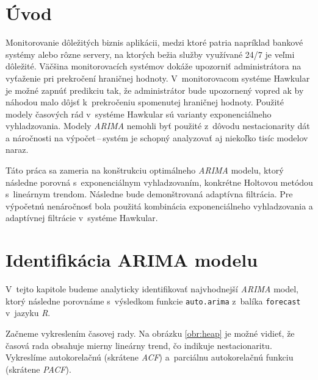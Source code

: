 \documentclass[12pt,a4paper,oneside,final]{article}
\theoremstyle{definition}
\theoremstyle{remark}
\numberwithin{equation}{section}
\begin{document}
\VytvorTitulniStranu

\section{Úvod}
Monitorovanie dôležitých biznis aplikácii, medzi ktoré patria napríklad bankové systémy alebo rôzne
servery, na ktorých bežia služby využívané 24/7 je veľmi dôležité. Väčšina
monitorovacích systémov dokáže upozorniť administrátora na vyťaženie pri prekročení
hraničnej hodnoty. V~monitorovacom systéme Hawkular je možné zapnúť predikciu tak, že
administrátor bude upozornený vopred ak by náhodou malo dôjsť k~prekročeniu spomenutej
hraničnej hodnoty. Použité modely časových rád v~systéme Hawkular sú varianty
exponenciálneho vyhladzovania. Modely \emph{ARIMA} nemohli byť použité z~dôvodu nestacionarity dát 
a náročnosti na výpočet\,--\,systém je schopný analyzovať aj niekoľko tisíc modelov naraz. 

Táto práca sa zameria na konštrukciu optimálneho \emph{ARIMA} modelu, ktorý následne porovná
s~exponenciálnym vyhladzovaním, konkrétne Holtovou metódou s~lineárnym trendom. Následne
bude demonštrovaná adaptívna filtrácia. Pre výpočetnú nenáročnosť  bola použitá 
kombinácia exponenciálneho vyhladzovania a
adaptívnej filtrácie v~systéme Hawkular.


\section{Identifikácia ARIMA modelu}
V~tejto kapitole budeme analyticky identifikovať najvhodnejší \emph{ARIMA} model, ktorý následne 
porovnáme s~výsledkom funkcie \texttt{auto.arima} z~balíka \texttt{forecast} v~jazyku
\emph{R}.

Začneme vykreslením časovej rady. Na obrázku \ref{obr:heap} je možné vidieť, že časová rada 
obsahuje mierny lineárny trend, čo indikuje nestacionaritu. Vykreslíme autokorelačnú 
(skrátene \emph{ACF}) a~parciálnu autokorelačnú funkciu (skrátene \emph{PACF}).
\end{document}
